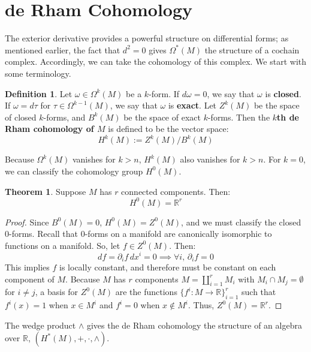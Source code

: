 \documentclass[11pt, oneside]{article}   	%
\theoremstyle{definition}
\newtheorem{definition}{Definition}[section]
\newtheorem{theorem}{Theorem}[section]
\begin{document}
\section{de Rham Cohomology}

The exterior derivative provides a powerful structure on differential forms; as mentioned earlier, the fact that $d^2 = 0$ gives 
$\Omega^*(M)$ the structure of a cochain complex. Accordingly, we can take the cohomology of this complex. We start 
with some terminology.
\begin{definition}
	Let $\omega\in\Omega^k(M)$ be a $k$-form. If $d\omega = 0$, we say that $\omega$ is \textbf{closed}. If $\omega = 
	d\tau$ for $\tau\in\Omega^{k - 1}(M)$, we say that $\omega$ is \textbf{exact}. Let $Z^k(M)$ be the space of closed 
	$k$-forms, and $B^k(M)$ be the space of exact $k$-forms. Then the \textbf{$k$th de Rham cohomology of $M$} is 
	defined to be the vector space:
	\begin{equation}
		H^k(M) := Z^k(M) / B^k(M)
	\end{equation}
\end{definition}

Because $\Omega^k(M)$ vanishes for $k > n$, $H^k(M)$ also vanishes for $k > n$. For $k = 0$, we can classify 
the cohomology group $H^0(M)$.
\begin{theorem}
	Suppose $M$ has $r$ connected components. Then:
	\begin{equation}
		H^0(M) = \mathbb R^r
	\end{equation}
\end{theorem}
\begin{proof}
	Since $B^0(M) = 0$, $H^0(M) = Z^0(M)$, and we must classify the closed $0$-forms. Recall that 0-forms on a manifold 
	are canonically isomorphic to functions on a manifold. So, let $f\in Z^0(M)$. Then:
	\begin{equation}
		df = \partial_i f\, dx^i = 0\implies \forall i,\,\partial_i f = 0
	\end{equation}
	This implies $f$ is locally constant, and therefore must be constant on each component of $M$. Because $M$ has $r$ 
	components $M = \coprod_{i = 1}^r M_i$ with $M_i\cap M_j = \emptyset$ for $i\neq j$, a basis for $Z^0(M)$ are the 
	functions $\{f^i : M\rightarrow\mathbb R\}_{i = 1}^r$ such that $f^i(x) = 1$ when $x\in M^i$ and $f^i = 0$ when $x\not\in 
	M^i$. Thus, $Z^0(M) = \mathbb R^r$. 
\end{proof}

The wedge product $\wedge$ gives the de Rham cohomology the structure of an algebra over $\mathbb R$, $(H^*(M), +, 
\cdot, \wedge)$. 
\end{document}
